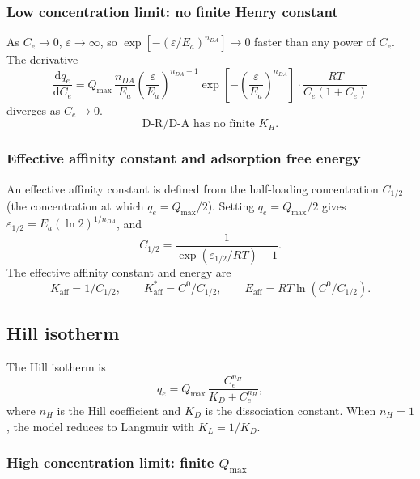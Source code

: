 \documentclass[journal=jacsat,manuscript=article]{achemso}
\begin{document}
\subsubsection{Low concentration limit: no finite Henry constant}

As $C_e \to 0$, $\varepsilon \to \infty$, so
$\exp[-(\varepsilon/E_a)^{n_{DA}}] \to 0$ faster than any power of $C_e$. The derivative
\begin{equation}
	\frac{\mathrm{d}q_e}{\mathrm{d}C_e}
	= Q_{\max}\, \frac{n_{DA}}{E_a}
	\left(\frac{\varepsilon}{E_a}\right)^{n_{DA}-1}
	\exp\!\left[-\left(\frac{\varepsilon}{E_a}\right)^{n_{DA}}\right]
	\cdot \frac{RT}{C_e(1+C_e)}
\end{equation}
diverges as $C_e \to 0$.
\begin{equation}
	\boxed{\text{D-R/D-A has no finite } K_H.}
\end{equation}

\subsubsection{Effective affinity constant and adsorption free energy}

An effective affinity constant is defined from the half-loading concentration $C_{1/2}$
(the concentration at which $q_e = Q_{\max}/2$).
Setting $q_e = Q_{\max}/2$ gives $\varepsilon_{1/2} = E_a(\ln 2)^{1/n_{DA}}$, and
\begin{equation}
	C_{1/2} = \frac{1}{\exp(\varepsilon_{1/2}/RT) - 1}.
\end{equation}
The effective affinity constant and energy are
\begin{equation}
	\boxed{
		K_{\mathrm{aff}} = 1/C_{1/2},
		\qquad
		K_{\mathrm{aff}}^{\ast} = C^0/C_{1/2},
		\qquad
		E_{\mathrm{aff}} = RT\ln(C^0/C_{1/2}).
	}
\end{equation}

\subsection{Hill isotherm}
\label{sec:si_hill}

The Hill isotherm is
\begin{equation}
	q_e = Q_{\max}\,\frac{C_e^{n_H}}{K_D + C_e^{n_H}},
	\label{eq:si_hill}
\end{equation}
where $n_H$ is the Hill coefficient and $K_D$ is the dissociation constant.
When $n_H = 1$, the model reduces to Langmuir with $K_L = 1/K_D$.

\subsubsection{High concentration limit: finite $Q_{\max}$}
\end{document}
